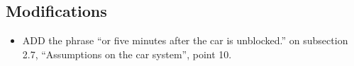 \documentclass[11pt]{article} %
\begin{document}
\subsection{Modifications}
\begin{itemize}
	\item ADD the phrase ``or five minutes after the car is unblocked.'' on subsection 2.7, ``Assumptions on the car system'', point 10.
\end{itemize}
\end{document}
